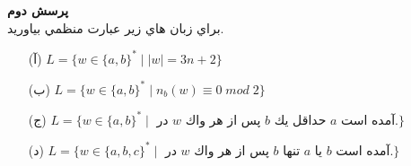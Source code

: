 \textbf{پرسش دوم}\\[0.1in]
براي زبان هاي زير عبارت منظمي بياوريد.
\begin{itemize}
    \item[(آ)]
    $L = \{w \in \{a, b\}^* \;|\; |w| = 3n + 2\}$
    \item[(ب)]
    $L = \{w \in \{a, b\}^* \;|\; n_b(w) \equiv 0\; mod\;2\}$
    \item[(ج)]
    $L = \{w \in \{a, b\}^* \;|\; \text{ در $w$ پس از هر واك $b$ حداقل يك $a$ آمده است.} \}$
    \item[(د)]
    $L = \{w \in \{a, b, c\}^* \;|\; \text{ در $w$ پس از هر واك $b$ تنها $a$ يا $b$ آمده است.} \}$
\end{itemize}